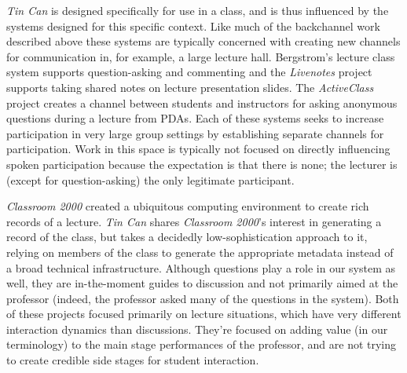 \emph{Tin Can} is designed specifically for use in a class, and is thus influenced by the systems designed for this specific context. Like much of the backchannel work described above these systems are typically concerned with creating new channels for communication in, for example, a large lecture hall. Bergstrom's lecture class system \citep{Bergstrom:wl} supports question-asking and commenting and the \emph{Livenotes} project \citep{Kam:2005wb} supports taking shared notes on lecture presentation slides. The \emph{ActiveClass} project \citep{Ratto:2003vs} creates a channel between students and instructors for asking anonymous questions during a lecture from PDAs.  Each of these systems seeks to increase participation in very large group settings by establishing separate channels for participation.  Work in this space is typically not focused on directly influencing spoken participation because the expectation is that there is none; the lecturer is (except for question-asking) the only legitimate participant.

\emph{Classroom 2000} \citep{Abowd:1998wp} created a ubiquitous computing environment to create rich records of a lecture. \emph{Tin Can} shares \emph{Classroom 2000}'s interest in generating a record of the class, but takes a decidedly low-sophistication approach to it, relying on members of the class to generate the appropriate metadata instead of a broad technical infrastructure. Although questions play a role in our system as well, they are in-the-moment guides to discussion and not primarily aimed at the professor (indeed, the professor asked many of the questions in the system). Both of these projects focused primarily on lecture situations, which have very different interaction dynamics than discussions. They're focused on adding value (in our terminology) to the main stage performances of the professor, and are not trying to create credible side stages for student interaction.


